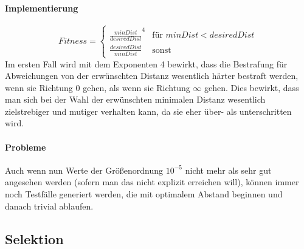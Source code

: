 \documentclass[12pt,a4paper]{scrartcl}
\begin{document}
\begin{enumerate}
	\paragraph{Implementierung}
	\begin{equation}
	Fitness = 
	\begin{cases}
		\frac{minDist}{desiredDist}^4 & \text{für } minDist < desiredDist \\
		\frac{desiredDist}{minDist} & \text{sonst}
	\end{cases}
	\end{equation}
	Im ersten Fall wird mit dem Exponenten 4 bewirkt, dass die Bestrafung für Abweichungen von der erwünschten Distanz wesentlich härter bestraft werden, wenn sie Richtung 0 gehen, als wenn sie Richtung $\infty$ gehen. Dies bewirkt, dass man sich bei der Wahl der erwünschten minimalen Distanz wesentlich zielstrebiger und mutiger verhalten kann, da sie eher über- als unterschritten wird.
	\paragraph{Probleme} Auch wenn nun Werte der Größenordnung $10^{-5}$ nicht mehr als sehr gut angesehen werden (sofern man das nicht explizit erreichen will), können immer noch Testfälle generiert werden, die mit optimalem Abstand beginnen und danach trivial ablaufen.
\end{enumerate} 

\subsection{Selektion}
% 
\end{document}

